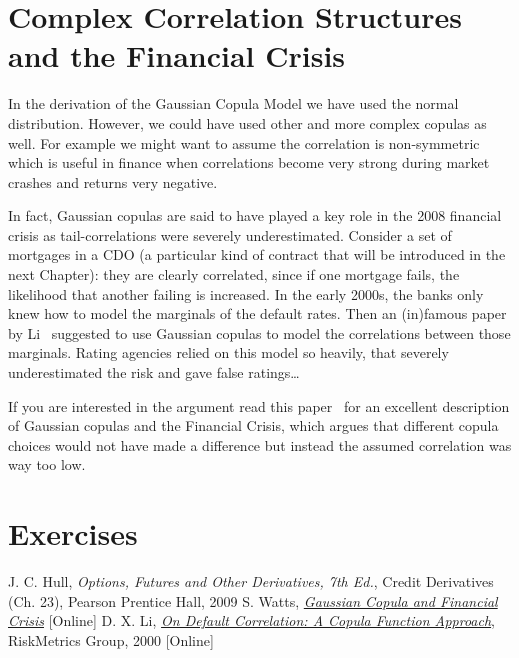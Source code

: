 \section{Complex Correlation Structures and the Financial Crisis}
\label{complex-correlation-structures-and-the-financial-crisis}

In the derivation of the Gaussian Copula Model we have used the normal distribution. However, we could have used other and more complex
copulas as well. For example we might want to assume the correlation is
non-symmetric which is useful in finance when correlations become
very strong during market crashes and returns very negative.

In fact, Gaussian copulas are said to have played a key role in the 2008
financial crisis as tail-correlations were severely underestimated.
Consider a set of mortgages in a CDO (a particular kind of contract that will be introduced in the next Chapter): they are clearly correlated, since if one mortgage fails,
the likelihood that another failing is increased. In the early 2000s,
the banks only knew how to model the marginals of the default rates. Then an
(in)famous paper by Li~\cite{bib:copula_li} suggested to use Gaussian copulas to model the
correlations between those marginals. Rating agencies relied on this model so heavily, that severely underestimated the risk and gave false ratings\ldots

If you are interested in the argument read this paper~\cite{bib:copula_and_2008} for an excellent description of Gaussian copulas and the Financial Crisis, which argues that different copula choices would not have made a difference but instead the assumed correlation was way too low.

\section{Exercises}


\begin{thebibliography}{9}
 J. C. Hull, \emph{Options, Futures and Other Derivatives, 7th Ed.}, Credit Derivatives (Ch. 23), Pearson Prentice Hall, 2009
 S. Watts, \href{http://samueldwatts.com/wp-content/uploads/2016/08/Watts-Gaussian-Copula_Financial_Crisis.pdf}{\emph{Gaussian Copula and Financial Crisis}} [Online]
D. X. Li, \href{http://www.maths.lth.se/matstat/kurser/fmsn15masm23/default.pdf}{\emph{On Default Correlation: A Copula Function Approach}}, RiskMetrics Group, 2000 [Online]
\end{thebibliography}
